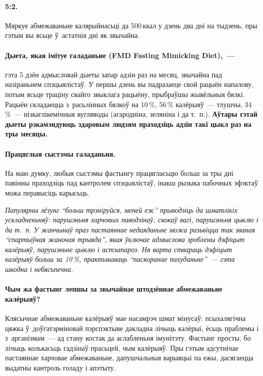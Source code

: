 \paragraph{5:2.} Мяркуе абмежаваньне калярыйнасьці да 500\,ккал у дзень два дні на тыдзень, пры гэтым вы ясьце ў~астатнія дні як звычайна.

\paragraph{Дыета, якая імітуе галаданьне (FMD Fasting Mimicking Diet),~---} гэта 5 дзён адмысловай дыеты запар адзін раз на месяц, звычайна пад назіраньнем спэцыялістаў. У першы дзень вы падразаеце свой рацыён напалову, потым ясьце траціну свайго звыклага рацыёну, прыбраўшы жывёльныя бялкі. Рацыён складаецца з~расьлінных бялкоў на 10\,\%, 56\,\% калёрыяў~--- тлушчы, 34\,\%~--- нізкаглікемічныя вугляводы (агародніна, зеляніна і да т.~п.). \textbf{Аўтары гэтай дыеты рэкамэндуюць здаровым людзям праходзіць адзін такі цыкл раз на тры месяцы.}

\paragraph{Працяглыя сыстэмы галаданьня.} На маю думку, любыя сыстэмы фастынгу працягласьцю больш за тры дні павінны праходзіць пад кантролем спэцыялістаў, інакш рызыка пабочных эфэктаў можа перавысіць карысьць. 

\emph{Папулярны лёзунг ``больш трэніруйся, меней еж'' прыводзіць да шматлікіх ускладненьняў: парушэньня харчовых паводзінаў, скокаў вагі, парушэньня цыклю і да т.~п. У жанчынаў праз пастаяннае недаяданьне можа разьвіцца так званая ``спартыўная жаночая трыяда'', якая ўключае адмыслова зроблены дэфіцыт калёрыяў, парушэньне цыклю і астэапароз. Ня варта ствараць дэфіцыт калёрыяў больш за 10\,\%, практыкаваць ``паскоранае пахуданьне''~--- гэта шкодна і небясьпечна.}

\paragraph{Чым жа фастынг лепшы за звычайнае штодзённае абмежаваньне калёрыяў?} Клясычнае абмежаваньне калёрыяў мае насамрэч шмат мінусаў: псыхалягічна цяжка ў~доўгатэрміновай пэрспэктыве дакладна лічыць калёрыі, ёсьць праблемы і з~арганізмам~--- ад стану костак да аслабленьня імунітэту. Фастынг просты, бо лічыць колькасьць гадзінаў прасьцей, чым калёрыяў. Пры гэтым адсутнічае пастаяннае харчовае абмежаваньне, дапушчальныя варыяцыі па ежы, дасягаецца выдатны кантроль голаду і апэтыту.

